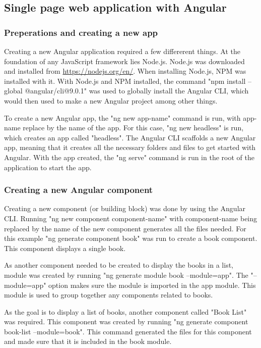 \subsection{Single page web application with Angular}

\subsubsection{Preperations and creating a new app}

Creating a new Angular application required a few differerent things. At the foundation of any JavaScript framework lies \gls{Node.js}. Node.js was downloaded and installed from \url{https://nodejs.org/en/}. When installing Node.js, \gls{NPM} was installed with it. With Node.js and NPM installed, the command "npm install --global @angular/cli@9.0.1" was used to globally install the Angular CLI, which would then used to make a new Angular project among other things.

To create a new Angular app, the "ng new {app-name}" command is run, with {app-name} replace by the name of the app. For this case, "ng new headless" is run, which creates an app called "headless". The Angular CLI scaffolds a new Angular app, meaning that it creates all the necessary folders and files to get started with Angular. With the app created, the "ng serve" command is run in the root of the application to start the app.


\subsubsection{Creating a new Angular component}

Creating a new component (or building block) was done by using the Angular CLI. Running "ng new component {component-name}" with {component-name} being replaced by the name of the new component generates all the files needed. For this example "ng generate component book" was run to create a book component. This component displays a single book. 

As another component needed to be created to display the books in a list, module was created by running "ng generate module book --module=app". The "--module=app" option makes sure the module is imported in the app module. This module is used to group together any components related to books.

As the goal is to display a list of books, another component called "Book List" was required. This component was created by running "ng generate component book-list --module=book". This command generated the files for this component and made sure that it is included in the book module.

